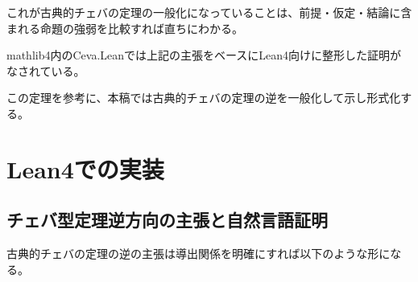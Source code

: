 \documentclass[a4paper,12pt]{bxjsbook}
\newlength{\customindent}
\newenvironment{body}{
  \par
  \begingroup
  \setlength{\leftskip}{\customindent}
  \setlength{\rightskip}{0pt}
  \setlength{\parindent}{1em}
  \setlength{\displayindent}{\customindent}
  \setlength{\displaywidth}{\dimexpr\linewidth-\customindent\relax}
}{
  \par
  \endgroup
}
\theoremstyle{theorem}
\begin{document}
    \begin{body}
        \indent これが古典的チェバの定理の一般化になっていることは、前提・仮定・結論に含まれる命題の強弱を比較すれば直ちにわかる。

        \indent mathlib4内のCeva.Leanでは上記の主張をベースにLean4向けに整形した証明がなされている。

        \indent この定理を参考に、本稿では古典的チェバの定理の逆を一般化して示し形式化する。
    \end{body}

    \chapter{Lean4での実装}

    \section{チェバ型定理逆方向の主張と自然言語証明}
    \begin{body}
        古典的チェバの定理の逆の主張は導出関係を明確にすれば以下のような形になる。
    \end{body}
\end{document}
